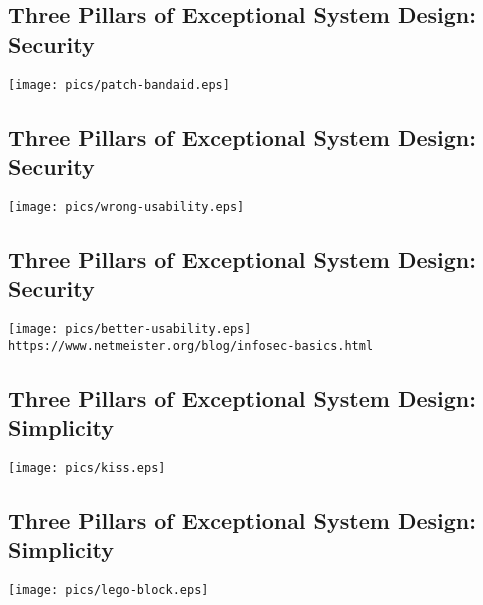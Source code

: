 \documentclass[xga]{xdvislides}
\begin{document}
\subsection{Three Pillars of Exceptional System Design: Security}
\vspace*{\fill}
\begin{center}
    \texttt{[image: pics/patch-bandaid.eps]} \\
\end{center}
\vspace*{\fill}

\subsection{Three Pillars of Exceptional System Design: Security}
\vspace*{\fill}
\begin{center}
    \texttt{[image: pics/wrong-usability.eps]} \\
\end{center}
\vspace*{\fill}

\subsection{Three Pillars of Exceptional System Design: Security}
\vspace*{\fill}
\begin{center}
    \texttt{[image: pics/better-usability.eps]} \\
	\small
	{\tt https://www.netmeister.org/blog/infosec-basics.html}
	\Normalsize
\end{center}
\vspace*{\fill}


\subsection{Three Pillars of Exceptional System Design: Simplicity}
\vspace*{\fill}
\begin{center}
    \texttt{[image: pics/kiss.eps]} \\
\end{center}
\vspace*{\fill}

\subsection{Three Pillars of Exceptional System Design: Simplicity}
\vspace*{\fill}
\begin{center}
    \texttt{[image: pics/lego-block.eps]} \\
\end{center}
\vspace*{\fill}
\end{document}
